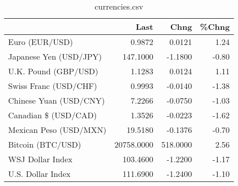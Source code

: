 \documentclass{article}%
\begin{document}
%


\begin{table}[htbp]%
\caption{currencies.csv}%
\centering%
\begin{adjustbox}{width=1\textwidth}%
\begin{tabular}{lrrr}
\toprule
                       &       Last &     Chng &  \%Chng \\
\midrule
        Euro (EUR/USD) &     0.9872 &   0.0121 &   1.24 \\
Japanese Yen (USD/JPY) &   147.1000 &  -1.1800 &  -0.80 \\
  U.K. Pound (GBP/USD) &     1.1283 &   0.0124 &   1.11 \\
 Swiss Franc (USD/CHF) &     0.9993 &  -0.0140 &  -1.38 \\
Chinese Yuan (USD/CNY) &     7.2266 &  -0.0750 &  -1.03 \\
  Canadian \$ (USD/CAD) &     1.3526 &  -0.0223 &  -1.62 \\
Mexican Peso (USD/MXN) &    19.5180 &  -0.1376 &  -0.70 \\
     Bitcoin (BTC/USD) & 20758.0000 & 518.0000 &   2.56 \\
      WSJ Dollar Index &   103.4600 &  -1.2200 &  -1.17 \\
     U.S. Dollar Index &   111.6900 &  -1.2400 &  -1.10 \\
\bottomrule
\end{tabular}
%
\end{adjustbox}%
\end{table}

%
\end{document}

